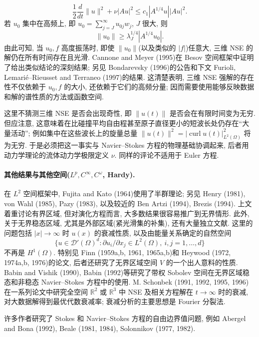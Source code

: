 \hypertarget{appendix-03-page-360}{}
\[
\frac12\frac d{dt}\lVert u\rVert^2+\nu|Au|^2
\leq c_1|A^{1/4}u||Au|^2.
\]
若 $u_0$ 集中在高频上, 即 $u_0=\sum_{j=J}^\infty u_{0j}w_j$, $J$ 很大, 则
\[
\lVert u_0\rVert\geq\lambda_J^{1/4}|A^{1/4}u_0|.
\]
由此可知, 当 $u_0,f$ 高度振荡时, 即使 $\lVert u_0\rVert$(以及类似的 $|f|$)任意大, 三维 NSE 的解仍在所有时间存在且光滑. Cannone and Meyer (1995)在 Besov 空间框架中证明了给出类似结论的深刻结果; 另见 Bondarevsky (1996)的公告和下文 Furioli, Lemarié--Rieusset and Terraneo (1997)的结果. 这清楚表明, 三维 NSE 强解的存在性不仅依赖于 $u_0,f$ 的大小, 还依赖于它们的高频分量; 因而需要使用能够反映数据和解的谱性质的方法或函数空间.

\begin{Remark}
\label{rem:app3-singularity-physical-scale}
这里不猜测三维 NSE 是否会出现奇性, 即 $\lVert u(t)\rVert$ 是否会在有限时间变为无穷. 但应注意, 这意味着在比碰撞平均自由程甚至原子直径更小的短波长处仍存在``大量活动''; 例如集中在这些波长上的旋量总量 $\lVert u(t)\rVert^2=|\operatorname{curl}u(t)|_{L^2(\Omega)}^2$ 将为无穷. 于是必须把这一事实与 Navier--Stokes 方程的物理基础协调起来, 后者用动力学理论的流体动力学极限定义 $\nu$. 同样的评论不适用于 Euler 方程.
\end{Remark}

\paragraph{其他结果与其他空间($L^p,C^\infty,C^\omega$, Hardy).}
在 $L^2$ 空间框架中, Fujita and Kato (1964)使用了半群理论; 另见 Henry (1981), von Wahl (1985), Pazy (1983), 以及较近的 Ben Artzi (1994), Brezis (1994). 上文着重讨论有界区域, 但对演化方程而言, 大多数结果很容易推广到无界情形. 此外, 关于无界稳态区域, 尤其是外部区域(紧光滑集的补集), 还有大量独立文献. 这里的问题包括 $|x|\to\infty$ 时 $u(x)$ 的衰减性质, 以及由能量关系确定的自然空间
\[
\{u\in\mathcal D'(\Omega)^d:\partial u_i/\partial x_j\in L^2(\Omega),\ i,j=1,\ldots,d\}
\]
不再是 $H^1(\Omega)$. 特别见 Finn (1959a,b, 1961, 1965a,b)和 Heywood (1972, 1974a,b, 1976)的论文, 后者还研究了无界区域空间 $V$ 的一个出人意料的性质. Babin and Vishik (1990), Babin (1992)等研究了带权 Sobolev 空间在无界区域稳态和非稳态 Navier--Stokes 方程中的使用. M. Schonbek (1991, 1992, 1995, 1996)在一系列论文中研究全空间 $\mathbb R^2$ 或 $\mathbb R^3$ 中 NSE 及相关方程解在 $t\to\infty$ 时的衰减, 对大数据解得到最优代数衰减率; 衰减分析的主要思想是 Fourier 分裂法.

许多作者研究了 Stokes 和 Navier--Stokes 方程的自由边界值问题, 例如 Abergel and Bona (1992), Beale (1981, 1984), Solonnikov (1977, 1982).

